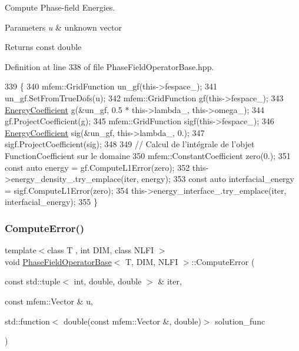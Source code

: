 Compute Phase-\/field Energies. 


\begin{DoxyParams}{Parameters}
{\em u} & unknown vector \\
\hline
\end{DoxyParams}
\begin{DoxyReturn}{Returns}
const double 
\end{DoxyReturn}


Definition at line 338 of file Phase\+Field\+Operator\+Base.\+hpp.


\begin{DoxyCode}
339                                                                     \{
340   mfem::GridFunction un\_gf(this->fespace\_);
341   un\_gf.SetFromTrueDofs(u);
342   mfem::GridFunction gf(this->fespace\_);
343   \hyperlink{classEnergyCoefficient}{EnergyCoefficient} g(&un\_gf, 0.5 * this->lambda\_, this->omega\_);
344   gf.ProjectCoefficient(g);
345   mfem::GridFunction sigf(this->fespace\_);
346   \hyperlink{classEnergyCoefficient}{EnergyCoefficient} sig(&un\_gf, this->lambda\_, 0.);
347   sigf.ProjectCoefficient(sig);
348 
349   \textcolor{comment}{// Calcul de l'intégrale de l'objet FunctionCoefficient sur le domaine}
350   mfem::ConstantCoefficient zero(0.);
351   \textcolor{keyword}{const} \textcolor{keyword}{auto} energy = gf.ComputeL1Error(zero);
352   this->energy\_density\_.try\_emplace(iter, energy);
353   \textcolor{keyword}{const} \textcolor{keyword}{auto} interfacial\_energy = sigf.ComputeL1Error(zero);
354   this->energy\_interface\_.try\_emplace(iter, interfacial\_energy);
355 \}
\end{DoxyCode}
\mbox{\label{classPhaseFieldOperatorBase_ae2166b96b4d740e05c5dd1ca36e9fc8c}} 
\subsubsection{\texorpdfstring{Compute\+Error()}{ComputeError()}}
{\footnotesize\ttfamily template$<$class T , int D\+IM, class N\+L\+FI $>$ \\
void \hyperlink{classPhaseFieldOperatorBase}{Phase\+Field\+Operator\+Base}$<$ T, D\+IM, N\+L\+FI $>$\+::Compute\+Error (\begin{DoxyParamCaption}\item[{const std\+::tuple$<$ int, double, double $>$ \&}]{iter,  }\item[{const mfem\+::\+Vector \&}]{u,  }\item[{std\+::function$<$ double(const mfem\+::\+Vector \&, double)$>$}]{solution\+\_\+func }\end{DoxyParamCaption})}



